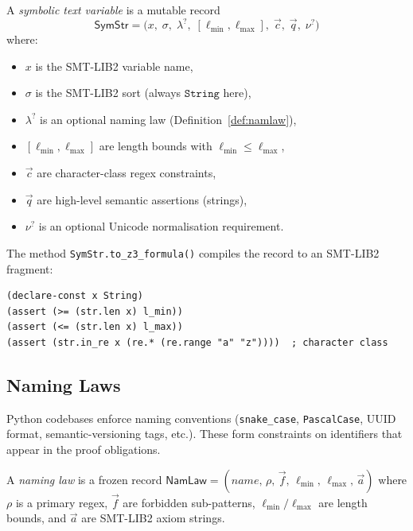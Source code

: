 \documentclass[11pt]{article}
\newcommand{\SymStr}{\ensuremath{\mathsf{SymStr}}}
\newcommand{\NamLaw}{\ensuremath{\mathsf{NamLaw}}}
\newcommand{\strsort}{\ensuremath{\mathtt{String}}}
\begin{document}
\begin{definition}
\label{def:symstr}
A \emph{symbolic text variable} is a mutable record
\[
  \SymStr = \bigl(
    x,\; \sigma,\; \lambda^?,\;
    [\ell_{\min}, \ell_{\max}],\;
    \vec{c},\; \vec{q},\; \nu^?
  \bigr)
\]
where:
\begin{itemize}
  \item $x$ is the SMT-LIB2 variable name,
  \item $\sigma$ is the SMT-LIB2 sort (always $\strsort$ here),
  \item $\lambda^?$ is an optional naming law (Definition~\ref{def:namlaw}),
  \item $[\ell_{\min}, \ell_{\max}]$ are length bounds with
    $\ell_{\min} \leq \ell_{\max}$,
  \item $\vec{c}$ are character-class regex constraints,
  \item $\vec{q}$ are high-level semantic assertions (strings),
  \item $\nu^?$ is an optional Unicode normalisation requirement.
\end{itemize}
\end{definition}

The method \texttt{SymStr.to\_z3\_formula()} compiles the record to an
SMT-LIB2 fragment:
\begin{lstlisting}[style=jugeo-python]
(declare-const x String)
(assert (>= (str.len x) l_min))
(assert (<= (str.len x) l_max))
(assert (str.in_re x (re.* (re.range "a" "z"))))  ; character class
\end{lstlisting}

\subsection{Naming Laws}
\label{sec:namlaws}

Python codebases enforce naming conventions (\texttt{snake\_case},
\texttt{PascalCase}, UUID format, semantic-versioning tags, etc.).  These
form constraints on identifiers that appear in the proof obligations.

\begin{definition}
\label{def:namlaw}
A \emph{naming law} is a frozen record
$\NamLaw = (\mathit{name},\, \rho,\, \vec{f},\, \ell_{\min},\,
  \ell_{\max},\, \vec{a})$
where $\rho$ is a primary regex, $\vec{f}$ are forbidden sub-patterns,
$\ell_{\min}/\ell_{\max}$ are length bounds, and $\vec{a}$ are SMT-LIB2
axiom strings.
\end{definition}
\end{document}
